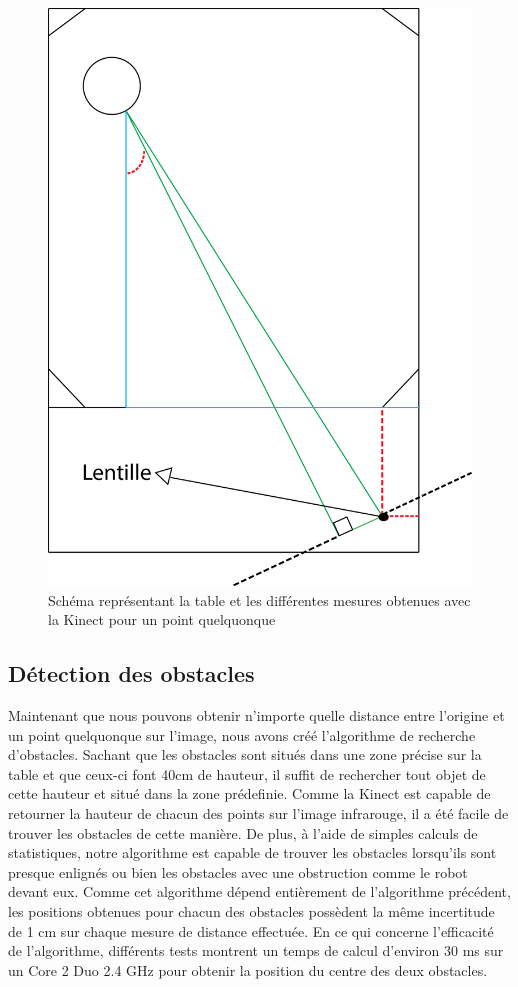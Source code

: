 \begin{figure}[htbp]
\centering
\includegraphics[scale=0.5]{fig/kinect_distance.png}
\caption{Schéma représentant la table et les différentes mesures obtenues avec la Kinect pour un point quelquonque}
\label{fig:kinect_distance}
\end{figure}

\subsection{Détection des obstacles}
Maintenant que nous pouvons obtenir n'importe quelle distance entre l'origine et un point quelquonque sur l'image, nous avons créé l'algorithme de recherche d'obstacles. Sachant que les obstacles sont situés dans une zone précise sur la table et que ceux-ci font 40cm de hauteur, il suffit de rechercher tout objet de cette hauteur et situé dans la zone prédefinie. Comme la Kinect est capable de retourner la hauteur de chacun des points sur l'image infrarouge, il a été facile de trouver les obstacles de cette manière. De plus, à l'aide de simples calculs de statistiques, notre algorithme est capable de trouver les obstacles lorsqu'ils sont presque enlignés ou bien les obstacles avec une obstruction comme le robot devant eux. Comme cet algorithme dépend entièrement de l'algorithme précédent, les positions obtenues pour chacun des obstacles possèdent la même incertitude de 1 cm sur chaque mesure de distance effectuée. En ce qui concerne l'efficacité de l'algorithme, différents tests montrent un temps de calcul d'environ 30 ms sur un Core 2 Duo 2.4 GHz pour obtenir la position du centre des deux obstacles.

